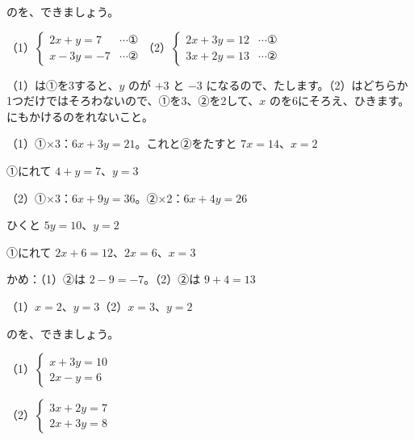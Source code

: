 \begin{reidai}
のを、できましょう。\par
（1）\nobreak $\begin{cases} 2x+y=7 & \cdots\text{①}\\ x-3y=-7 & \cdots\text{②} \end{cases}$\qquad（2）\nobreak $\begin{cases} 2x+3y=12 & \cdots\text{①}\\ 3x+2y=13 & \cdots\text{②} \end{cases}$\par
\kangaekata （1）は①を3すると、$y$ のが $+3$ と $-3$ になるので、たします。（2）はどちらか1つだけではそろわないので、①を3、②を2して、$x$ のを6にそろえ、ひきます。にもかけるのをれないこと。\par
\shiki（1）\nobreak ①×3：$6x+3y=21$。これと②をたすと $7x=14$、$x=2$\par
\hspace*{2.6\zw}\phantom{（1）}①にれて $4+y=7$、$y=3$\par
\hspace*{2.6\zw}（2）\nobreak ①×3：$6x+9y=36$。②×2：$6x+4y=26$\par
\hspace*{2.6\zw}\phantom{（2）}ひくと $5y=10$、$y=2$\par
\hspace*{2.6\zw}\phantom{（2）}①にれて $2x+6=12$、$2x=6$、$x=3$\par
\hspace*{2.6\zw}かめ：（1）②は $2-9=-7$。（2）②は $9+4=13$\par
\kotae（1）\nobreak $x=2$、$y=3$\quad（2）\nobreak $x=3$、$y=2$
\end{reidai}

\begin{jibun}
のを、できましょう。\par
（1）\nobreak $\begin{cases} x+3y=10\\ 2x-y=6 \end{cases}$\par
（2）\nobreak $\begin{cases} 3x+2y=7\\ 2x+3y=8 \end{cases}$
\end{jibun}

